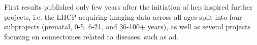 \documentclass[plainreport]{cgvpub}
\begin{document}
	First results published only few years after the initiation of \acrshort{hcp} inspired further projects, i.e. the \Gls{LHCP} acquiring imaging data across all ages split into four subprojects (prenatal, 0-5, 6-21, and 36-100+ years), as well as several projects focusing on connectomes related to diseases, such as \acrshort{ad}.

	\printglossary[type=gloss_terms]
	\printglossary[type=gloss_acr]
	\nocite{*}
	
	
\end{document}
